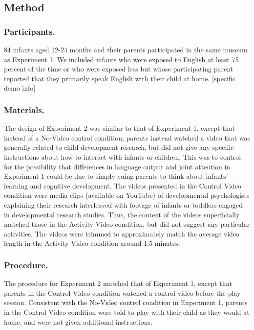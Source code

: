 \documentclass[10pt, letterpaper]{article}
\begin{document}
\subsection{Method}\label{method-1}

\subsubsection{Participants.}\label{participants.-1}

84 infants aged 12-24 months and their parents participated in the same
museum as Experiment 1. We included infants who were exposed to English
at least 75 percent of the time or who were exposed less but whose
participating parent reported that they primarily speak English with
their child at home. {[}specific demo info{]}

\subsubsection{Materials.}\label{materials.-1}

The design of Experiment 2 was similar to that of Experiment 1, except
that instead of a No-Video control condition, parents instead watched a
video that was generally related to child development research, but did
not give any specific instructions about how to interact with infants or
children. This was to control for the possibility that differences in
language output and joint attention in Experiment 1 could be due to
simply cuing parents to think about infants' learning and cognitive
development. The videos presented in the Control Video condition were
media clips (available on YouTube) of developmental psychologists
explaining their research interleaved with footage of infants or
toddlers engaged in developmental research studies. Thus, the content of
the videos superficially matched those in the Activity Video condition,
but did not suggest any particular activities. The videos were trimmed
to approximately match the average video length in the Activity Video
condition around 1.5 minutes.

\subsubsection{Procedure.}\label{procedure.-1}

The procedure for Experiment 2 matched that of Experiment 1, except that
parents in the Control Video condition watched a control video before
the play session. Consistent with the No-Video control condition in
Experiment 1, parents in the Control Video condition were told to play
with their child as they would at home, and were not given additional
instructions.
\end{document}
